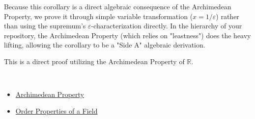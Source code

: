 \begin{remark*}
Because this corollary is a direct algebraic consequence of the Archimedean Property, we prove it through simple variable transformation ($x = 1/\varepsilon$) rather than using the supremum's $\varepsilon$-characterization directly. In the hierarchy of your repository, the Archimedean Property (which relies on "leastness") does the heavy lifting, allowing the corollary to be a "Side A" algebraic derivation.
\end{remark*}

\begin{remark*}
This is a direct proof utilizing the Archimedean Property of $\mathbb{R}$.
\end{remark*}

\begin{remark*}[Dependencies]~\\
\begin{itemize}
  \item \hyperref[thm:archimedean-property]{Archimedean Property}
  \item \hyperref[ax:field-order-properties]{Order Properties of a Field}
\end{itemize}
\end{remark*}